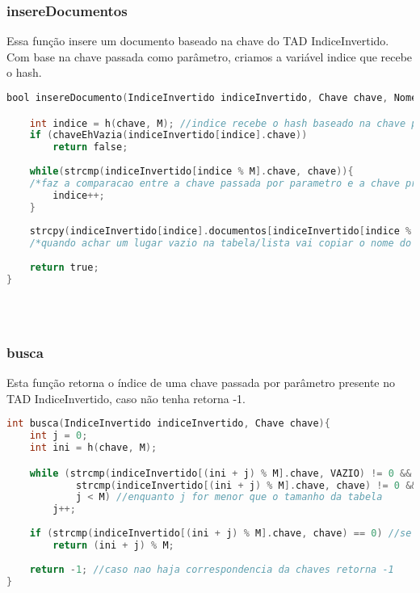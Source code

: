 \documentclass{article}
\begin{document}
\subsubsection{insereDocumentos}

Essa função insere um documento baseado na chave do TAD IndiceInvertido. Com base na chave passada como parâmetro,
criamos a variável indice que recebe o hash.

\begin{lstlisting}[caption={Função insereDocumento},label={lst:cod3},language=C]
bool insereDocumento(IndiceInvertido indiceInvertido, Chave chave, NomeDocumento nomeDocumento){

    int indice = h(chave, M); //indice recebe o hash baseado na chave passada por parametro e tamanho da tabela 
    if (chaveEhVazia(indiceInvertido[indice].chave)) 
        return false;
    
    while(strcmp(indiceInvertido[indice % M].chave, chave)){ 
    /*faz a comparacao entre a chave passada por parametro e a chave presente na tabela do indiceInvertido. Enquanto as chaves forem iguais o indice vai mudando.*/
        indice++;  
    }
    
    strcpy(indiceInvertido[indice].documentos[indiceInvertido[indice % M].n++], nomeDocumento);  
    /*quando achar um lugar vazio na tabela/lista vai copiar o nome do documento passado como parametro para o documento presente no indiceInvertido*/
    
    return true;
}


    
    \end{lstlisting}

\subsubsection{busca}
Esta função retorna o índice de uma chave passada por parâmetro presente no TAD IndiceInvertido, caso não tenha retorna -1.

\begin{lstlisting}[caption={Função busca},label={lst:cod4},language=C]
int busca(IndiceInvertido indiceInvertido, Chave chave){
    int j = 0;
    int ini = h(chave, M);

    while (strcmp(indiceInvertido[(ini + j) % M].chave, VAZIO) != 0 &&
            strcmp(indiceInvertido[(ini + j) % M].chave, chave) != 0 && // compara se a chave do parametro e a presente na tabela sao diferentes
            j < M) //enquanto j for menor que o tamanho da tabela
        j++; 
    
    if (strcmp(indiceInvertido[(ini + j) % M].chave, chave) == 0) //se as chaves forem iguais retorna a posicao na tabela
        return (ini + j) % M;
    
    return -1; //caso nao haja correspondencia da chaves retorna -1
}

\end{lstlisting}
\end{document}
